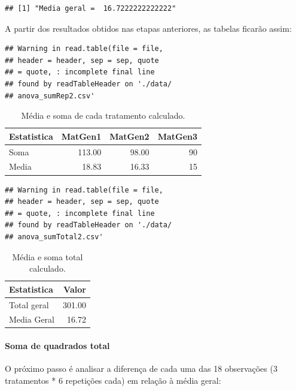 \documentclass[
]{article}
\begin{document}
\begin{verbatim}
## [1] "Media geral =  16.7222222222222"
\end{verbatim}

A partir dos resultados obtidos nas etapas anteriores, as tabelas ficarão assim:

\begin{verbatim}
## Warning in read.table(file = file,
## header = header, sep = sep, quote
## = quote, : incomplete final line
## found by readTableHeader on './data/
## anova_sumRep2.csv'
\end{verbatim}

\begin{table}

\caption{\label{tab:unnamed-chunk-13}Média e soma de cada tratamento calculado.}
\centering
\begin{tabular}[t]{l|r|r|r}
\hline
Estatistica & MatGen1 & MatGen2 & MatGen3\\
\hline
Soma & 113.00 & 98.00 & 90\\
\hline
Media & 18.83 & 16.33 & 15\\
\hline
\end{tabular}
\end{table}

\begin{verbatim}
## Warning in read.table(file = file,
## header = header, sep = sep, quote
## = quote, : incomplete final line
## found by readTableHeader on './data/
## anova_sumTotal2.csv'
\end{verbatim}

\begin{table}

\caption{\label{tab:unnamed-chunk-14}Média e soma total calculado.}
\centering
\begin{tabular}[t]{l|r}
\hline
Estatistica & Valor\\
\hline
Total geral & 301.00\\
\hline
Media Geral & 16.72\\
\hline
\end{tabular}
\end{table}

\hypertarget{soma-de-quadrados-total}{%
\paragraph{Soma de quadrados total}\label{soma-de-quadrados-total}}

O próximo passo é analisar a diferença de cada uma das 18 observações (3 tratamentos * 6 repetições cada) em relação à média geral:
\end{document}
